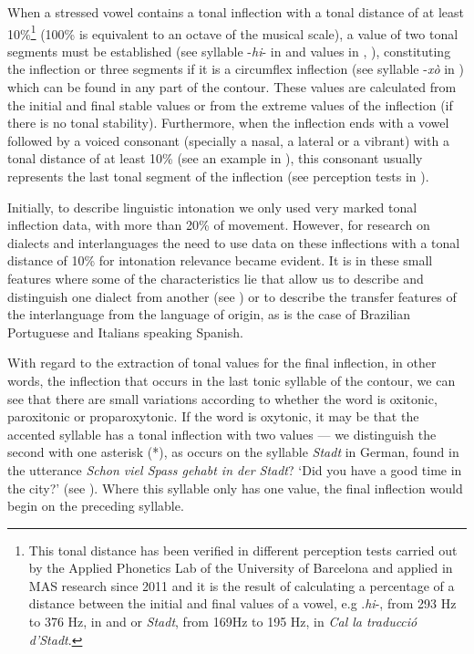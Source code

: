 \documentclass[output=paper]{langscibook}
\begin{document}
When a stressed vowel contains a tonal inflection with a tonal distance of at least 10\%\footnote{This tonal distance has been verified in different perception tests carried out by the Applied Phonetics Lab of the University of Barcelona and applied in MAS research since 2011 and it is the result of calculating a percentage of a distance between the initial and final values of a vowel, e.g .\textit{hi}-, from 293 Hz to 376 Hz, in  and  or \textit{Stadt}, from 169Hz to 195 Hz, in  \textit{Cal la traducció d’Stadt}.} (100\% is equivalent to an octave of the musical scale), a value of two tonal segments must be established (see syllable -\textit{hi}- in  and values in , ), constituting the inflection or three segments if it is a circumflex inflection (see syllable -\textit{xò} in ) which can be found in any part of the contour. These values are calculated from the initial and final stable values or from the extreme values of the inflection (if there is no tonal stability). Furthermore, when the inflection ends with a vowel followed by a voiced consonant (specially a nasal, a lateral or a vibrant) with a tonal distance of at least 10\% (see an example in ), this consonant usually represents the last tonal segment of the inflection (see perception tests in \citealt{FontRotches.2007}). 

Initially, to describe linguistic intonation we only used very marked tonal inflection data, with more than 20\% of movement. However, for research on dialects and interlanguages the need to use data on these inflections with a tonal distance of 10\% for intonation relevance became evident. It is in these small features where some of the characteristics lie that allow us to describe and distinguish one dialect from another (see \citealt{BallesterosPanizo.2011,MateoRuiz.2014}) or to describe the transfer features of the interlanguage from the language of origin, as is the case of Brazilian Portuguese \citep{FonsecadeOliveira.2013} and Italians \citep{DevisHerraiz.2011didactica} speaking Spanish.

With regard to the extraction of tonal values for the final inflection, in other words, the inflection that occurs  in the last tonic syllable of the contour, we can see that there are small variations according to whether the word is oxitonic,  paroxitonic or proparoxytonic. If the word is oxytonic, it may be that the accented syllable has a tonal inflection with two values — we distinguish the second with one asterisk (*), as occurs on the syllable \textit{Stadt} in German, found in the utterance \textit{Schon viel Spass gehabt in der Stadt}? ‘Did you have a good time in the city?’ (see ). Where this syllable only has one value, the final inflection would begin on the preceding syllable.
\end{document}
